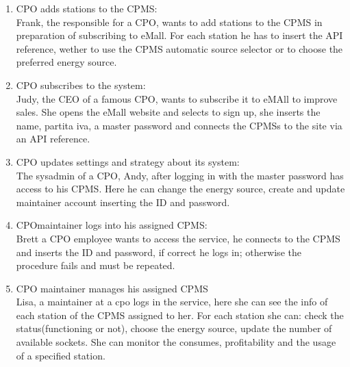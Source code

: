 \begin{enumerate}[label=\textbf{S\arabic*}]
      \item \ac{CPO} adds stations to the \ac{CPMS}:\\
            Frank, the responsible for a \ac{CPO}, wants to add stations to the \ac{CPMS} in preparation of subscribing to eMall. For each station he has to insert the \ac{API} reference,
            wether to use the \ac{CPMS} automatic source selector or to choose the preferred energy source.\label{SCE:cpo-adds-stations}
      \item \ac{CPO} subscribes to the system:\\
            Judy, the CEO of a famous \ac{CPO}, wants to subscribe it to eMAll to improve sales.
            She opens the eMall website and selects to sign up, she inserts the name, partita iva, a master password and connects the \acp{CPMS} to the site via an \ac{API} reference.\label{SCE:cpo-subscribes}
      \item \ac{CPO} updates settings and strategy about its system:\\
            The sysadmin of a \ac{CPO}, Andy, after logging in with the master password has access to his \ac{CPMS}.
            Here he can change the energy source, create and update maintainer account inserting the ID and password.\label{SCE:cpo-updates-settings}
      \item \ac{CPO}maintainer logs into his assigned \ac{CPMS}:\\
            Brett a \ac{CPO} employee wants to access the service, he connects to the \ac{CPMS} and inserts the ID
            and password, if correct he logs in; otherwise the procedure fails and must be repeated.\label{SCE:cpomaintainer-logs}
      \item \ac{CPO} maintainer manages his assigned \ac{CPMS}\\
            Lisa, a maintainer at a cpo logs in the service, here she can see the info of each station of the \ac{CPMS} assigned to her.
            For each station she can: check the status(functioning or not), choose the energy source, update the number of available sockets.
            She can monitor the consumes, profitability and the usage of a specified station.\label{SCE:cpomaintainer-manages}
\end{enumerate}

